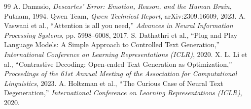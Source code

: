 \documentclass[10pt,twocolumn]{article}
\begin{document}
\begin{thebibliography}{99}
 A. Damasio, \textit{Descartes' Error: Emotion, Reason, and the Human Brain}, Putnam, 1994.
 Qwen Team, \textit{Qwen Technical Report}, arXiv:2309.16609, 2023.
 A. Vaswani et al., ``Attention is all you need,'' \textit{Advances in Neural Information Processing Systems}, pp. 5998--6008, 2017.
 S. Dathathri et al., ``Plug and Play Language Models: A Simple Approach to Controlled Text Generation,'' \textit{International Conference on Learning Representations (ICLR)}, 2020.
 X. L. Li et al., ``Contrastive Decoding: Open-ended Text Generation as Optimization,'' \textit{Proceedings of the 61st Annual Meeting of the Association for Computational Linguistics}, 2023.
 A. Holtzman et al., ``The Curious Case of Neural Text Degeneration,'' \textit{International Conference on Learning Representations (ICLR)}, 2020.
\end{thebibliography}
\end{document}
